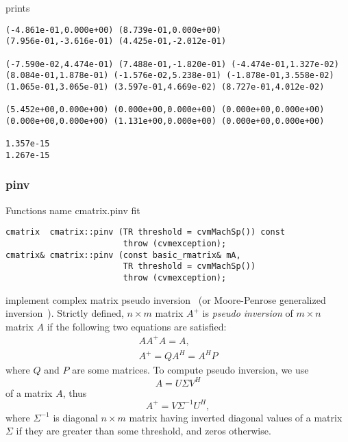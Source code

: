 prints
\begin{Verbatim}
(-4.861e-01,0.000e+00) (8.739e-01,0.000e+00)
(7.956e-01,-3.616e-01) (4.425e-01,-2.012e-01)

(-7.590e-02,4.474e-01) (7.488e-01,-1.820e-01) (-4.474e-01,1.327e-02)
(8.084e-01,1.878e-01) (-1.576e-02,5.238e-01) (-1.878e-01,3.558e-02)
(1.065e-01,3.065e-01) (3.597e-01,4.669e-02) (8.727e-01,4.012e-02)

(5.452e+00,0.000e+00) (0.000e+00,0.000e+00) (0.000e+00,0.000e+00)
(0.000e+00,0.000e+00) (1.131e+00,0.000e+00) (0.000e+00,0.000e+00)

1.357e-15
1.267e-15
\end{Verbatim}
\newpage






\subsubsection{pinv}
Functions%
\pdfdest name {cmatrix.pinv} fit
\begin{verbatim}
cmatrix  cmatrix::pinv (TR threshold = cvmMachSp()) const 
                        throw (cvmexception);
cmatrix& cmatrix::pinv (const basic_rmatrix& mA, 
                        TR threshold = cvmMachSp()) 
                        throw (cvmexception);
\end{verbatim}
implement complex matrix pseudo inversion~
(or Moore-Penrose generalized inversion~).
Strictly defined,  $n\times m$ matrix $A^{+}$ is 
\textit{pseudo inversion} of $m\times n$ matrix $A$ if the following two equations
are satisfied:
\begin{gather*}
AA^{+}A=A,\\
A^{+}=QA^H=A^HP
\end{gather*}
where $Q$ and $P$ are some matrices. To compute  pseudo inversion, we use
\begin{equation*}
A = U\Sigma V^H
\end{equation*}
of a matrix $A$, thus
\begin{equation*}
A^{+} = V\Sigma^{-1}U^{H},
\end{equation*}
where $\Sigma^{-1}$ is  diagonal $n\times m$ matrix having inverted
diagonal values of a matrix $\Sigma$ if they are greater than some threshold,
and zeros otherwise.

